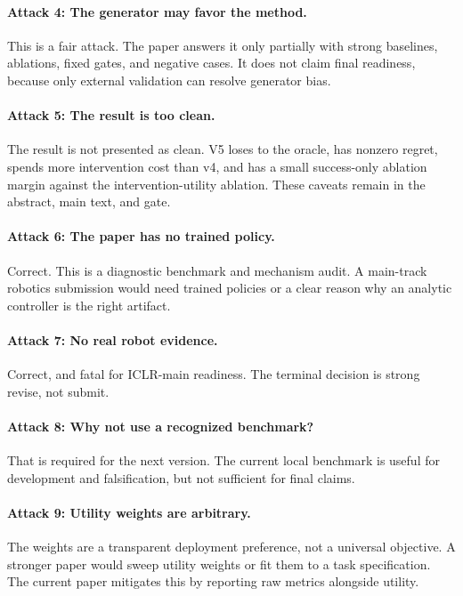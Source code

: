\documentclass{article}
\begin{document}
\paragraph{Attack 4: The generator may favor the method.}
This is a fair attack. The paper answers it only partially with strong baselines, ablations, fixed gates, and negative cases. It does not claim final readiness, because only external validation can resolve generator bias.

\paragraph{Attack 5: The result is too clean.}
The result is not presented as clean. V5 loses to the oracle, has nonzero regret, spends more intervention cost than v4, and has a small success-only ablation margin against the intervention-utility ablation. These caveats remain in the abstract, main text, and gate.

\paragraph{Attack 6: The paper has no trained policy.}
Correct. This is a diagnostic benchmark and mechanism audit. A main-track robotics submission would need trained policies or a clear reason why an analytic controller is the right artifact.

\paragraph{Attack 7: No real robot evidence.}
Correct, and fatal for ICLR-main readiness. The terminal decision is strong revise, not submit.

\paragraph{Attack 8: Why not use a recognized benchmark?}
That is required for the next version. The current local benchmark is useful for development and falsification, but not sufficient for final claims.

\paragraph{Attack 9: Utility weights are arbitrary.}
The weights are a transparent deployment preference, not a universal objective. A stronger paper would sweep utility weights or fit them to a task specification. The current paper mitigates this by reporting raw metrics alongside utility.
\end{document}
